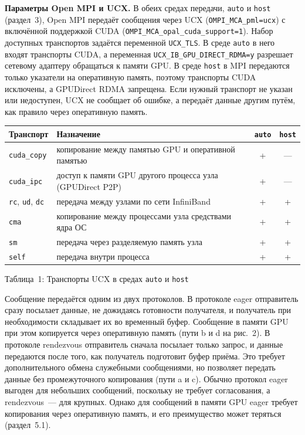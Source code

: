 \textbf{Параметры Open MPI и UCX.} В обеих средах передачи, \texttt{auto} и \texttt{host} (раздел~3), Open MPI передаёт сообщения через UCX (\texttt{OMPI\_MCA\_pml=ucx}) с включённой поддержкой CUDA (\texttt{OMPI\_MCA\_opal\_cuda\_support=1}). Набор доступных транспортов задаётся переменной \texttt{UCX\_TLS}. В среде \texttt{auto} в него входят транспорты CUDA, а переменная \texttt{UCX\_IB\_GPU\_DIRECT\_RDMA=y} разрешает сетевому адаптеру обращаться к памяти GPU. В среде \texttt{host} в MPI передаются только указатели на оперативную память, поэтому транспорты CUDA исключены, а GPUDirect RDMA запрещена. Если нужный транспорт не указан или недоступен, UCX не сообщает об ошибке, а передаёт данные другим путём, как правило через оперативную память.

\medskip
\noindent\begin{minipage}{\textwidth}
\begin{center}
\small
\renewcommand{\arraystretch}{1.15}
\begin{tabular}{@{}l>{\raggedright\arraybackslash}p{}cc@{}}
\hline
Транспорт & Назначение & \texttt{auto} & \texttt{host} \\
\hline
\texttt{cuda\_copy} & копирование между памятью GPU и оперативной памятью & + & --- \\
\texttt{cuda\_ipc} & доступ к памяти GPU другого процесса узла (GPUDirect P2P) & + & --- \\
\texttt{rc}, \texttt{ud}, \texttt{dc} & передача между узлами по сети InfiniBand & + & + \\
\texttt{cma} & копирование между процессами узла средствами ядра ОС & + & + \\
\texttt{sm} & передача через разделяемую память узла & + & + \\
\texttt{self} & передача внутри процесса & + & + \\
\hline
\end{tabular}

\smallskip
{\normalsize Таблица~1: Транспорты UCX в средах \texttt{auto} и \texttt{host}}
\end{center}
\end{minipage}
\medskip

Сообщение передаётся одним из двух протоколов. В протоколе eager отправитель сразу посылает данные, не дожидаясь готовности получателя, и получатель при необходимости складывает их во временный буфер. Сообщение в памяти GPU при этом копируется через оперативную память (пути b и d на рис.~2). В протоколе rendezvous отправитель сначала посылает только запрос, и данные передаются после того, как получатель подготовит буфер приёма. Это требует дополнительного обмена служебными сообщениями, но позволяет передать данные без промежуточного копирования (пути a и c). Обычно протокол eager выгоден для небольших сообщений, поскольку не требует согласования, а rendezvous~--- для крупных. Однако для сообщений в памяти GPU eager требует копирования через оперативную память, и его преимущество может теряться (раздел~5.1).

